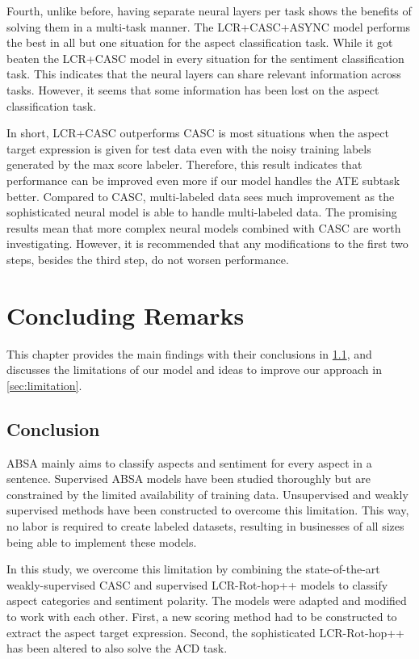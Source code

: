 \documentclass[american, oneside]{ecsgdp}
\begin{document}
Fourth, unlike before, having separate neural layers per task shows the benefits of solving them in a multi-task manner. The LCR+CASC+ASYNC model performs the best in all but one situation for the aspect classification task. While it got beaten the LCR+CASC model in every situation for the sentiment classification task. This indicates that the neural layers can share relevant information across tasks. However, it seems that some information has been lost on the aspect classification task.

In short, LCR+CASC outperforms CASC is most situations when the aspect target expression is given for test data even with the noisy training labels generated by the max score labeler. Therefore, this result indicates that performance can be improved even more if our model handles the ATE subtask better. Compared to CASC, multi-labeled data sees much improvement as the sophisticated neural model is able to handle multi-labeled data. The promising results mean that more complex neural models combined with CASC are worth investigating. However, it is recommended that any modifications to the first two steps, besides the third step, do not worsen performance. 

\chapter{Concluding Remarks} \label{chap:remarks}
This chapter provides the main findings with their conclusions in \cref{sec:conclusion}, and discusses the limitations of our model and ideas to improve our approach in \cref{sec:limitation}.

\section{Conclusion} \label{sec:conclusion}
ABSA mainly aims to classify aspects and sentiment for every aspect in a sentence. Supervised ABSA models have been studied thoroughly but are constrained by the limited availability of training data. Unsupervised and weakly supervised methods have been constructed to overcome this limitation. This way, no labor is required to create labeled datasets, resulting in businesses of all sizes being able to implement these models.

In this study, we overcome this limitation by combining the state-of-the-art weakly-supervised CASC \parencite{Kumar2021CASC} and supervised LCR-Rot-hop++ \parencite{Trusca2020HAABSA++} models to classify aspect categories and sentiment polarity. The models were adapted and modified to work with each other. First, a new scoring method had to be constructed to extract the aspect target expression. Second, the sophisticated LCR-Rot-hop++ has been altered to also solve the ACD task.
\end{document}
